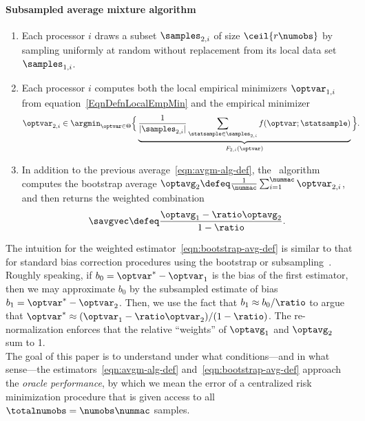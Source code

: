 \documentclass[11pt,twoside]{article}
\theoremstyle{definition}
\newcommand{\MYMIN}[1]{\ensuremath{\Big\{#1 \Big \}}}
\begin{document}
\paragraph{Subsampled average mixture algorithm}
\begin{enumerate}
\item[(1)] Each processor $i$ draws a subset $\samples_{2,i}$ of size
  $\ceil{r \numobs}$ by sampling uniformly at random without
  replacement from its local data set $\samples_{1,i}$.

\item[(2)] Each processor $i$ computes both the local empirical
  minimizers $\optvar_{1,i}$ from equation~\eqref{EqnDefnLocalEmpMin}
  and the empirical minimizer
  \begin{align}
    \optvar_{2,i} & \in \argmin_{\optvar \in \Theta }
    \MYMIN{\underbrace{\frac{1}{|\samples_{2,i}|} \sum_{\statsample \in
          \samples_{2,i}} f(\optvar; \statsample)}_{F_{2,i}(\optvar)}}.
  \end{align}

\item[(3)] In addition to the previous
  average~\eqref{eqn:avgm-alg-def}, the \savgm\ algorithm computes the
  bootstrap average $\optavg_2 \defeq \frac{1}{\nummac}
  \sum_{i=1}^\nummac \optvar_{2,i}$, and then returns the weighted
  combination
  \begin{equation}
    \label{eqn:bootstrap-avg-def}
    \savgvec \defeq \frac{\optavg_1 - \ratio \optavg_2}{1 - \ratio}.
  \end{equation}
\end{enumerate}

%
The intuition for the weighted estimator~\eqref{eqn:bootstrap-avg-def} is
similar to that for standard bias correction procedures using the bootstrap or
subsampling~\citep{EfronTi93,Hall92, PolitisRoWo99}.  Roughly speaking, if $b_0
= \optvar^* - \optvar_1$ is the bias of the first estimator, then we may
approximate $b_0$ by the subsampled estimate of bias $b_1 = \optvar^* -
\optvar_2$. Then, we use the fact that
$b_1 \approx b_0 / \ratio$ to argue that $\optvar^* \approx
(\optvar_1 - \ratio \optvar_2) / (1-\ratio)$. The re-normalization
enforces that the
relative ``weights'' of $\optavg_1$ and $\optavg_2$ sum to 1. \\


The goal of this paper is to understand under what
conditions---and in what sense---the
estimators~\eqref{eqn:avgm-alg-def} and~\eqref{eqn:bootstrap-avg-def}
approach the \emph{oracle performance}, by which we mean the error of
a centralized risk minimization procedure that is given access to all
$\totalnumobs = \numobs\nummac$ samples.
\end{document}
